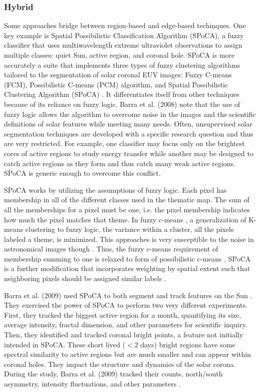 \documentclass[twoside]{report}
\begin{document}
\subsubsection{Hybrid}
Some approaches bridge between region-based and edge-based techinques. One key example is Spatial Possibilistic Classification Algorithm (SPoCA), a fuzzy classifier that uses multiwavelength extreme ultraviolet observations to assign multiple classes: quiet Sun, active region, and coronal hole. SPoCA is more accurately a suite that implements three types of fuzzy clustering algorithms tailored to the segmentation of solar coronal EUV images: Fuzzy C-means (FCM),  Possibilistic C-means (PCM) algorithm, and Spatial Possibilistic Clustering Algorithm (SPoCA) \cite{verbeeck2014spoca}. It differentiates itself from other techniques because of its reliance on fuzzy logic. Barra et al. (2008) note that the use of fuzzy logic allows the algorithm to overcome noise in the images and the scientific definitions of solar features while meeting many needs. Often, unsupervised solar segmentation techniques are developed with a specific research question and thus are very restricted. For example, one classifier may focus only on the brightest cores of active regions to study energy transfer while another may be designed to catch active regions as they form and thus catch many weak active regions. SPoCA is generic enough to overcome this conflict.

SPoCA works by utilizing the assumptions of fuzzy logic. Each pixel has membership in all of the different classes used in the thematic map. The sum of all the memberships for a pixel must be one, i.e. the pixel membership indicates how much the pixel matches that theme. In fuzzy c-means \cite{cmeans}, a generalization of K-means clustering to fuzzy logic, the variance within a cluster, all the pixels labeled a theme, is minimized. This approaches is very susceptible to the noise in astronomical images though \cite{krishnapuram1993possibilistic}. Thus, the fuzzy c-means requirement of membership summing to one is relaxed to form of possibilistic c-means \cite{krishnapuram1996possibilistic}. SPoCA is a further modification that incorporates weighting by spatial extent such that neighboring pixels should be assigned similar labels \cite{barra:2008, barra:2009}. 

Barra et al. (2009) used SPoCA to both segment and track features on the Sun \cite{barra:2009}. They exercised the power of SPoCA to perform two very different experiments. First, they tracked the biggest active region for a month, quantifying its size, average intensity, fractal dimension, and other parameters for scientific inquiry. Then, they identified and tracked coronal bright points, a feature not initially intended in SPoCA. These short lived ($< 2$ days) bright regions have some spectral similarity to active regions but are much smaller and can appear within coronal holes. They impact the structure and dynamics of the solar corona. During the study, Barra et al. (2009) tracked their counts, north/south asymmetry, intensity fluctuations, and other parameters \cite{barra:2009}.  
\end{document}
